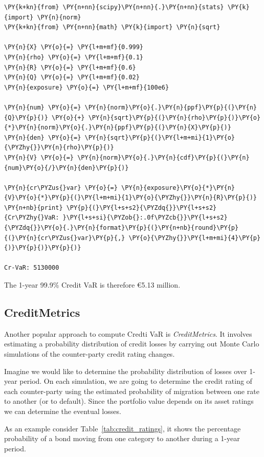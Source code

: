 \begin{codebox}
\begin{Verbatim}[commandchars=\\\{\}]
\PY{k+kn}{from} \PY{n+nn}{scipy}\PY{n+nn}{.}\PY{n+nn}{stats} \PY{k}{import} \PY{n}{norm}
\PY{k+kn}{from} \PY{n+nn}{math} \PY{k}{import} \PY{n}{sqrt}
		
\PY{n}{X} \PY{o}{=} \PY{l+m+mf}{0.999}
\PY{n}{rho} \PY{o}{=} \PY{l+m+mf}{0.1}
\PY{n}{R} \PY{o}{=} \PY{l+m+mf}{0.6}
\PY{n}{Q} \PY{o}{=} \PY{l+m+mf}{0.02}
\PY{n}{exposure} \PY{o}{=} \PY{l+m+mf}{100e6}
		
\PY{n}{num} \PY{o}{=} \PY{n}{norm}\PY{o}{.}\PY{n}{ppf}\PY{p}{(}\PY{n}{Q}\PY{p}{)} \PY{o}{+} \PY{n}{sqrt}\PY{p}{(}\PY{n}{rho}\PY{p}{)}\PY{o}{*}\PY{n}{norm}\PY{o}{.}\PY{n}{ppf}\PY{p}{(}\PY{n}{X}\PY{p}{)}
\PY{n}{den} \PY{o}{=} \PY{n}{sqrt}\PY{p}{(}\PY{l+m+mi}{1}\PY{o}{\PYZhy{}}\PY{n}{rho}\PY{p}{)}
\PY{n}{V} \PY{o}{=} \PY{n}{norm}\PY{o}{.}\PY{n}{cdf}\PY{p}{(}\PY{n}{num}\PY{o}{/}\PY{n}{den}\PY{p}{)}
		
\PY{n}{cr\PYZus{}var} \PY{o}{=} \PY{n}{exposure}\PY{o}{*}\PY{n}{V}\PY{o}{*}\PY{p}{(}\PY{l+m+mi}{1}\PY{o}{\PYZhy{}}\PY{n}{R}\PY{p}{)}
\PY{n+nb}{print} \PY{p}{(}\PY{l+s+s2}{\PYZdq{}}\PY{l+s+s2}{Cr\PYZhy{}VaR: }\PY{l+s+si}{\PYZob{}:.0f\PYZcb{}}\PY{l+s+s2}{\PYZdq{}}\PY{o}{.}\PY{n}{format}\PY{p}{(}\PY{n+nb}{round}\PY{p}{(}\PY{n}{cr\PYZus{}var}\PY{p}{,} \PY{o}{\PYZhy{}}\PY{l+m+mi}{4}\PY{p}{)}\PY{p}{)}\PY{p}{)}

Cr-VaR: 5130000
\end{Verbatim}
\noindent
The 1-year 99.9\% Credit VaR is therefore \euro{5.13} million.

\subsection{CreditMetrics}
Another popular approach to compute Credti VaR is \emph{CreditMetrics}. It involves estimating a probability distribution of credit losses by carrying out Monte Carlo simulations of the counter-party credit rating changes.

Imagine we would like to determine the probability distribution of losses over 1-year period. On each simulation, we are going to determine the credit rating of each counter-party using the estimated probability of migration between one rate to another (or to default). Since the portfolio value depends on its asset ratings we can determine the eventual losses. 

As an example consider Table~\ref{tab:credit_ratings}, it shows the percentage probability of a bond moving from one category to another during a 1-year period.


\end{codebox}
